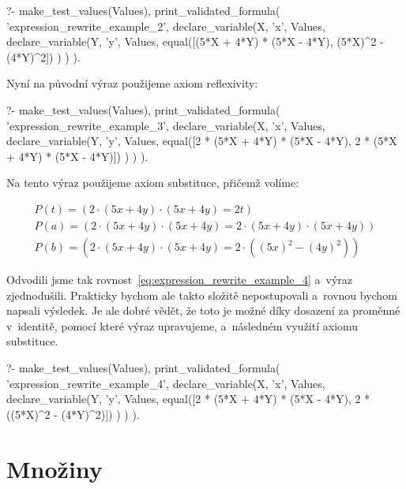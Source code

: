 \begin{prolog}
?- 	make_test_values(Values),
	print_validated_formula(
		'expression_rewrite_example_2',
		declare_variable(X, 'x', Values,
			declare_variable(Y, 'y', Values,
				equal([(5*X + 4*Y) * (5*X - 4*Y), (5*X)^2 - (4*Y)^2])
			)
		)
	).
\end{prolog}

Nyní na původní výraz použijeme axiom reflexivity:

\begin{prolog}
?- 	make_test_values(Values),
	print_validated_formula(
		'expression_rewrite_example_3',
		declare_variable(X, 'x', Values,
			declare_variable(Y, 'y', Values,
				equal([2 * (5*X + 4*Y) * (5*X - 4*Y), 2 * (5*X + 4*Y) * (5*X - 4*Y)])
			)
		)
	).
\end{prolog}

Na tento výraz použijeme axiom substituce, přičemž volíme:

\begin{equation}
\begin{split}
P(t) = (2 \cdot (5 x + 4 y) \cdot (5 x + 4 y) = 2 t) \\
P(a) = (2 \cdot (5 x + 4 y) \cdot (5 x + 4 y) = 2 \cdot (5 x + 4 y) \cdot (5 x + 4 y)) \\
P(b) = (2 \cdot (5 x + 4 y) \cdot (5 x + 4 y) = 2 \cdot ((5 x)^2 - (4 y)^2))
\end{split}
\end{equation}

Odvodili jsme tak rovnost~\eqref{eq:expression_rewrite_example_4} a~výraz zjednodušili. Prakticky bychom ale takto složitě nepostupovali a~rovnou bychom napsali výsledek. Je ale dobré vědět, že toto je možné díky dosazení za proměnné v~identitě, pomocí které výraz upravujeme, a~následném využití axiomu substituce.

\begin{prolog}
?- 	make_test_values(Values),
	print_validated_formula(
		'expression_rewrite_example_4',
		declare_variable(X, 'x', Values,
			declare_variable(Y, 'y', Values,
				equal([2 * (5*X + 4*Y) * (5*X - 4*Y), 2 * ((5*X)^2 - (4*Y)^2)])
			)
		)
	).
\end{prolog}

\section{Množiny}

